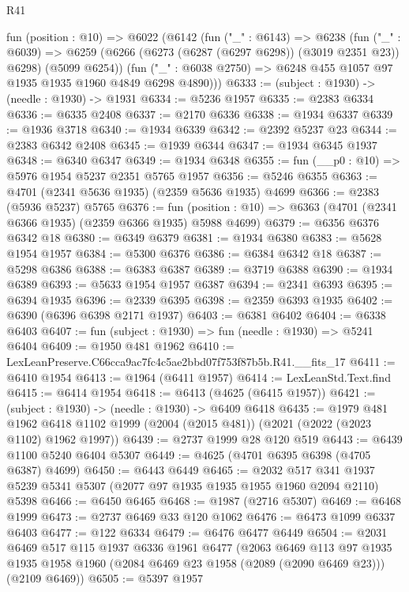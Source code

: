 \begin{lexlean}{R41}
\begin{coremodule}
  fun (position : @10) =>
  @6022
    (@6142
      (fun ("_" : @6143) =>
      @6238
        (fun ("_" : @6039) =>
        @6259 (@6266 (@6273 (@6287 (@6297 @6298)) (@3019 @2351 @23)) @6298) (@5099 @6254))
        (fun ("_" : @6038 @2750) => @6248 @455 @1057 @97 @1935 @1935 @1960 @4849 @6298 @4890)))
@6333 := (subject : @1930) -> (needle : @1930) -> @1931
@6334 := @5236 @1957
@6335 := @2383 @6334
@6336 := @6335 @2408
@6337 := @2170 @6336
@6338 := @1934 @6337
@6339 := @1936 @3718
@6340 := @1934 @6339
@6342 := @2392 @5237 @23
@6344 := @2383 @6342 @2408
@6345 := @1939 @6344
@6347 := @1934 @6345 @1937
@6348 := @6340 @6347
@6349 := @1934 @6348
@6355 := fun (__p0 : @10) => @5976 @1954 @5237 @2351 @5765 @1957
@6356 := @5246 @6355
@6363 := @4701 (@2341 @5636 @1935) (@2359 @5636 @1935) @4699
@6366 := @2383 (@5936 @5237) @5765
@6376 := fun (position : @10) => @6363 (@4701 (@2341 @6366 @1935) (@2359 @6366 @1935) @5988 @4699)
@6379 := @6356 @6376 @6342 @18
@6380 := @6349 @6379
@6381 := @1934 @6380
@6383 := @5628 @1954 @1957
@6384 := @5300 @6376
@6386 := @6384 @6342 @18
@6387 := @5298 @6386
@6388 := @6383 @6387
@6389 := @3719 @6388
@6390 := @1934 @6389
@6393 := @5633 @1954 @1957 @6387
@6394 := @2341 @6393
@6395 := @6394 @1935
@6396 := @2339 @6395
@6398 := @2359 @6393 @1935
@6402 := @6390 (@6396 @6398 @2171 @1937)
@6403 := @6381 @6402
@6404 := @6338 @6403
@6407 := fun (subject : @1930) => fun (needle : @1930) => @5241 @6404
@6409 := @1950 @481 @1962
@6410 := LexLeanPreserve.C66cca9ac7fc4c5ae2bbd07f753f87b5b.R41.__fits_17
@6411 := @6410 @1954
@6413 := @1964 (@6411 @1957)
@6414 := LexLeanStd.Text.find
@6415 := @6414 @1954
@6418 := @6413 (@4625 (@6415 @1957))
@6421 := (subject : @1930) -> (needle : @1930) -> @6409 @6418
@6435 := @1979
    @481
    @1962
    @6418
    @1102
    @1999
    (@2004 (@2015 @481))
    (@2021 (@2022 (@2023 @1102) @1962 @1997))
@6439 := @2737 @1999 @28 @120 @519
@6443 := @6439 @1100 @5240 @6404 @5307
@6449 := @4625 (@4701 @6395 @6398 (@4705 @6387) @4699)
@6450 := @6443 @6449
@6465 := @2032
    @517
    @341
    @1937
    @5239
    @5341
    @5307
    (@2077 @97 @1935 @1935 @1955 @1960 @2094 @2110)
    @5398
@6466 := @6450 @6465
@6468 := @1987 (@2716 @5307)
@6469 := @6468 @1999
@6473 := @2737 @6469 @33 @120 @1062
@6476 := @6473 @1099 @6337 @6403
@6477 := @122 @6334
@6479 := @6476 @6477 @6449
@6504 := @2031
    @6469
    @517
    @115
    @1937
    @6336
    @1961
    @6477
    (@2063
      @6469
      @113
      @97
      @1935
      @1935
      @1958
      @1960
      (@2084 @6469 @23 @1958 (@2089 (@2090 @6469 @23)))
      (@2109 @6469))
@6505 := @5397 @1957

\end{coremodule}
\end{lexlean}
